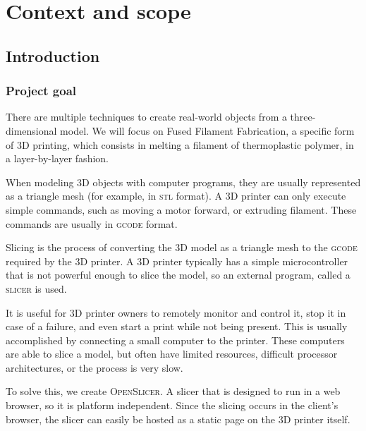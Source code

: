 \section{Context and scope}

\subsection{Introduction}
\subsubsection{Project goal}
There are multiple techniques to create real-world objects from a three-dimensional model.
We will focus on Fused Filament Fabrication, a specific form of 3D printing, which consists in melting a filament of thermoplastic polymer, in a layer-by-layer fashion.

When modeling 3D objects with computer programs, they are usually represented as a triangle mesh (for example, in \textsc{stl} format). A 3D printer can only execute simple commands, such as moving a motor forward, or extruding filament. These commands are usually in \textsc{gcode} format.

Slicing is the process of converting the 3D model as a triangle mesh to the \textsc{gcode} required by the 3D printer. A 3D printer typically has a simple microcontroller that is not powerful enough to slice the model, so an external program, called a \textsc{slicer} is used.

It is useful for 3D printer owners to remotely monitor and control it, stop it in case of a failure, and even start a print while not being present. This is usually accomplished by connecting a small computer to the printer. These computers  are able to slice a model, but often have limited resources, difficult processor architectures, or the process is very slow.

To solve this, we create \textsc{OpenSlicer}. A slicer that is designed to run in a web browser, so it is platform independent. Since the slicing occurs in the client's browser, the slicer can easily be hosted as a static page on the 3D printer itself.


